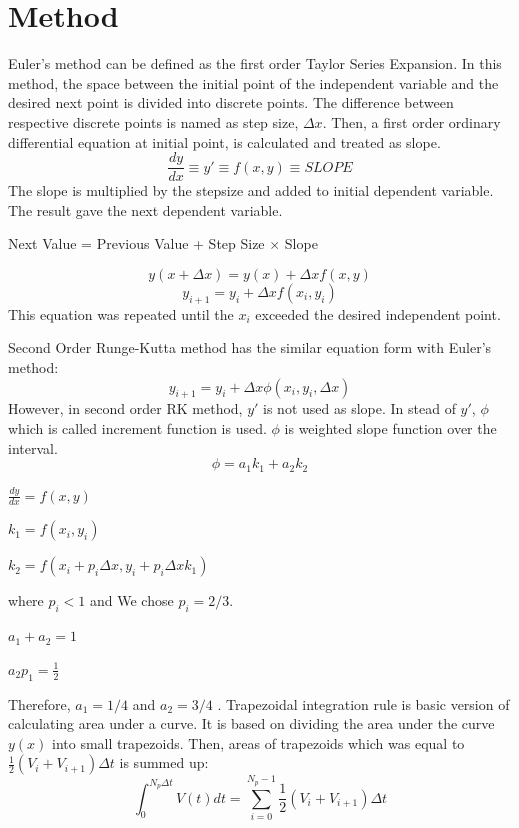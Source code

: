 \documentclass[letterpaper,12pt]{article}
\begin{document}
\section{Method}
Euler's method can be defined as the first order Taylor Series Expansion. In this method, the space between
the initial point of the independent variable and the desired next point is divided into discrete points. The 
difference between respective discrete points is named as step size, $\Delta x$. Then, a first order ordinary
differential equation at initial point, is calculated and treated as slope.
\begin{equation}
\frac{dy}{dx} \equiv y \prime \equiv f(x,y) \equiv SLOPE
\end{equation}
The slope is multiplied by the stepsize
and added to initial dependent variable. The result gave the next dependent variable.

\begin{center}
Next Value = Previous Value + Step Size $\times $ Slope
\end{center}
\begin{equation}
y(x + \Delta x ) = y(x) + \Delta x f(x,y)
\end{equation}
\begin{equation}
y_{i+1} = y_i + \Delta x f(x_i , y_i)
\label{eq:eul}
\end{equation}
This equation was repeated until the $x_i$ exceeded the desired independent point.

Second Order Runge-Kutta method has the similar equation form with Euler's method:
\begin{equation}
y_{i+1} = y_i + \Delta x \phi (x_i , y_i, \Delta x)
\label{eq:rk2}
\end{equation}
However, in second order RK method, $y\prime $ is not used as slope. In stead of $y\prime $, $\phi$ which is 
called increment function is used. $\phi$ is weighted slope function over the interval.
\begin{equation}
\phi = a_1k_1 + a_2k_2
\end{equation}
\begin{center}
$ \frac{dy}{dx} = f(x,y) $  

\doublespacing
$k_1 = f(x_i,y_i)$ 

\doublespacing
$k_2 = f(x_i+p_i\Delta x, y_i+p_i\Delta x k_1)$
\end{center}
where $p_i<1$  and
We chose $p_i = 2/3 $.
\begin{center}
$a_1+a_2 = 1$ 

\doublespacing
$a_2p_1 = \frac{1}{2}$
\end{center}
Therefore, $a_1=1/4$ and $a_2=3/4$ .
Trapezoidal integration rule is basic version of calculating area under a curve. It is based on
dividing the area under the curve $y(x)$ into small trapezoids. Then, areas of trapezoids which was equal to 
$\frac {1}{2}(V_i+V_{i+1})\Delta t $ is summed up:
\begin{equation}
\int_{0}^{N_p\Delta t} V(t) dt = \sum_{i=0}^{N_p-1} \frac{1}{2}(V_i+V_{i+1}) \Delta t 
\end{equation}
\end{document}
